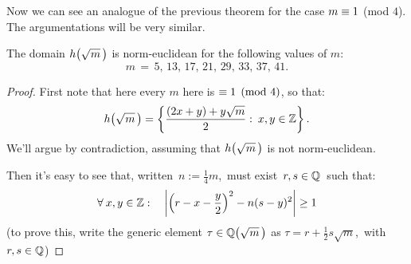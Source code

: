 Now we can see an analogue of the previous theorem for
the case $m \equiv 1$ (mod $4$). The argumentations
will be very similar.

\begin{thm}\label{normed_UFDs_3}
The domain $\hh{m}$ is norm-euclidean for the following
values of $m$:
$$ m\, =\, 5,\, 13,\, 17,\, 21,\, 29,\, 33,\, 37,\, 41. $$
\end{thm}

\begin{proof}
%
First note that here every $m$ here is $\equiv 1 \pmod 4$, so that:
$$
\hh{m} = \left\{\dfrac{(2x + y) + y\sqrt{m}}{2}:\: x, y \in \Z\right\}.
$$
We'll argue by contradiction, assuming that $\hh{m}$ is not
norm-euclidean.

Then it's easy to see that, written\, $n := \frac{1}{4}m$,
\,must exist\, $r, s \in \mathbb{Q}$\, such that:
\begin{equation}\label{new_r_and_s_basic_eq}
\forall\: x,y \in \mathbb{Z}: \quad
\left| \left(r - x - \frac{y}{2}\right)^2 - n(s - y)^2 \right|
\geq 1
\end{equation}
(to prove this, write the generic element $\tau \in \QQ{m}$
as $\tau = r + \frac{1}{2}s\sqrt{m}$,\, with $r, s \in \mathbb{Q}$)


\end{proof}
